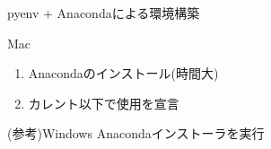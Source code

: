 \documentclass[12pt, dvipdfmx]{beamer}
\begin{document}
\begin{frame}{pyenv + Anacondaによる環境構築}
    \begin{block}{Mac}
        \begin{enumerate}
            \item Anacondaのインストール(時間大)
            \installanaconda
            \item カレント以下で使用を宣言
            \useanaconda
        \end{enumerate}
    \end{block}
    \begin{exampleblock}{(参考)Windows}
        Anacondaインストーラを実行
    \end{exampleblock}
\end{frame}
\end{document}
